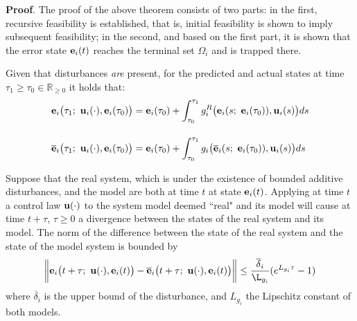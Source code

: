 \textbf{Proof}. The proof of the above theorem consists of two parts:
in the first, recursive feasibility is established, that is, initial
feasibility is shown to imply subsequent feasibility; in the second, and based
on the first part, it is shown that the error state $\bm{\mathbf{e}}_i(t)$ reaches
the terminal set $\Omega_i$ and is trapped there.\\[1ex]


\begin{bw_box}
  \begin{remark}
    Given that disturbances \textit{are} present, for the predicted and actual
    states at time $\tau_1 \geq \tau_0 \in \mathbb{R}_{\geq 0}$ it holds that:
    \begin{align}
      \bm{\mathbf{e}}_i\big(\tau_1;\ \bm{\mathbf{u}}_i(\cdot), \bm{\mathbf{e}}_i(\tau_0)\big) &=
        \bm{\mathbf{e}}_i(\tau_0) + \int_{\tau_0}^{\tau_1} g_i^R\big(\bm{\mathbf{e}}_i(s;\ \bm{\mathbf{e}}_i(\tau_0)), \bm{\mathbf{u}}_i(s)\big) ds \\[2.5ex]
      \overline{\bm{\mathbf{e}}}_i\big(\tau_1;\ \bm{\mathbf{u}}_i(\cdot), \bm{\mathbf{e}}_i(\tau_0)\big) &=
        \bm{\mathbf{e}}_i(\tau_0) + \int_{\tau_0}^{\tau_1} g_i\big(\overline{\bm{\mathbf{e}}}_i(s;\ \bm{\mathbf{e}}_i(\tau_0)), \bm{\mathbf{u}}_i(s)\big) ds
    \end{align}
    \label{remark:predicted_actual_equations_with_disturbance}
  \end{remark}
\end{bw_box}


\begin{bw_box}
  \begin{lemma}
    Suppose that the real system, which is under the existence of bounded
    additive disturbances, and the model are both at time $t$ at state
    $\bm{\mathbf{e}}_i(t)$. Applying at time $t$ a control law $\bm{\mathbf{u}}(\cdot)$
    to the system model deemed ``real" and its model will cause at time $t + \tau$,
    $\tau \geq 0$ a divergence between the states of the real system and its
    model. The norm of the difference between the state of the real system
    and the state of the model system is bounded by
    \begin{align}
      \bigg\| \vect{e}_i\big(t + \tau;\ \vect{u}(\cdot), \vect{e}_i(t)\big) -
        \overline{\vect{e}}_i\big(t + \tau;\ \vect{u}(\cdot), \vect{e}_i(t)\big) \bigg\|
        \leq \dfrac{\overline{\delta}_i}{\L_{g_i}} (e^{L_{g_i} \tau} - 1)
    \end{align}
    where $\overline{\delta}_i$ is the upper bound of the disturbance,
    and $L_{g_i}$ the Lipschitz constant of both models.
  \label{lemma:diff_state_from_same_conditions}
  \end{lemma}
\end{bw_box}

